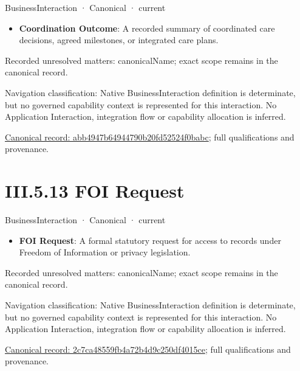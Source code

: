 \label{element:abb4947b64944790b20fd52524f0babc}
{\small BusinessInteraction · Canonical · current}\par

\begin{itemize}


\item \textbf{Coordination Outcome}: A recorded summary of coordinated care decisions, agreed milestones, or integrated care plans.

\end{itemize}

{\small Recorded unresolved matters: canonicalName; exact scope remains in the canonical record.}\par
{\small Navigation classification: Native BusinessInteraction definition is determinate, but no governed capability context is represented for this interaction. No Application Interaction, integration flow or capability allocation is inferred.}\par
{\footnotesize \href{../../../../../../../continuum/business/business-interaction/abb4947b64944790b20fd52524f0babc.md}{Canonical record: abb4947b64944790b20fd52524f0babc}; full qualifications and provenance.}\par
\section*{III.5.13 FOI Request}
\label{navigation:III.5.13}

\label{element:2c7ca48559fb4a72b4d9c250df4015ce}
{\small BusinessInteraction · Canonical · current}\par

\begin{itemize}


\item \textbf{FOI Request}: A formal statutory request for access to records under Freedom of Information or privacy legislation.

\end{itemize}

{\small Recorded unresolved matters: canonicalName; exact scope remains in the canonical record.}\par
{\small Navigation classification: Native BusinessInteraction definition is determinate, but no governed capability context is represented for this interaction. No Application Interaction, integration flow or capability allocation is inferred.}\par
{\footnotesize \href{../../../../../../../continuum/business/business-interaction/2c7ca48559fb4a72b4d9c250df4015ce.md}{Canonical record: 2c7ca48559fb4a72b4d9c250df4015ce}; full qualifications and provenance.}\par
